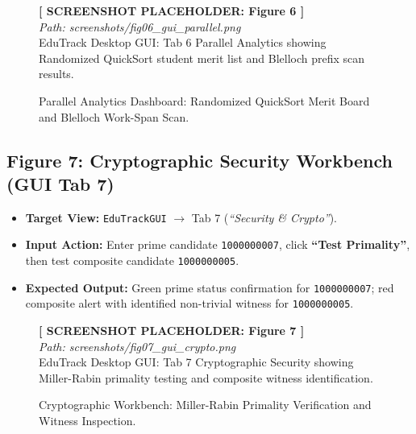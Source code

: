 \begin{figure}[H]
\centering
\begin{tcolorbox}[colback=white,colframe=codegray,width=0.92\textwidth,halign=center]
\vspace{0.8cm}
\textbf{[ SCREENSHOT PLACEHOLDER: Figure 6 ]}\\
\textit{Path: screenshots/fig06_gui_parallel.png}\\
\small EduTrack Desktop GUI: Tab 6 Parallel Analytics showing Randomized QuickSort student merit list and Blelloch prefix scan results.
\vspace{0.8cm}
\end{tcolorbox}
\caption{Parallel Analytics Dashboard: Randomized QuickSort Merit Board and Blelloch Work-Span Scan.}
\label{fig:ss_parallel}
\end{figure}

\subsection{Figure 7: Cryptographic Security Workbench (GUI Tab 7)}
\begin{itemize}
    \item \textbf{Target View:} \texttt{EduTrackGUI} $\to$ Tab 7 (\textit{``Security \& Crypto''}).
    \item \textbf{Input Action:} Enter prime candidate \texttt{1000000007}, click \textbf{``Test Primality''}, then test composite candidate \texttt{1000000005}.
    \item \textbf{Expected Output:} Green prime status confirmation for \texttt{1000000007}; red composite alert with identified non-trivial witness for \texttt{1000000005}.
\end{itemize}

\begin{figure}[H]
\centering
\begin{tcolorbox}[colback=white,colframe=codegray,width=0.92\textwidth,halign=center]
\vspace{0.8cm}
\textbf{[ SCREENSHOT PLACEHOLDER: Figure 7 ]}\\
\textit{Path: screenshots/fig07_gui_crypto.png}\\
\small EduTrack Desktop GUI: Tab 7 Cryptographic Security showing Miller-Rabin primality testing and composite witness identification.
\vspace{0.8cm}
\end{tcolorbox}
\caption{Cryptographic Workbench: Miller-Rabin Primality Verification and Witness Inspection.}
\label{fig:ss_crypto}
\end{figure}

